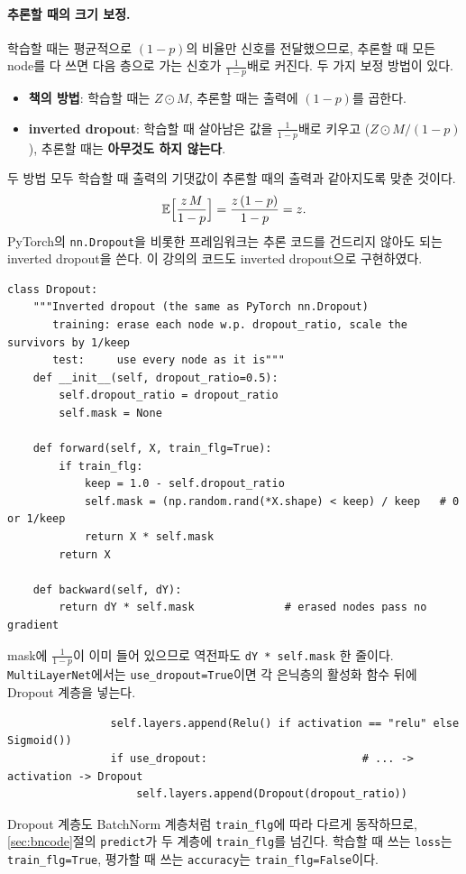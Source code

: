 \documentclass[11pt,a4paper]{article}
\begin{document}
\paragraph{추론할 때의 크기 보정.}
학습할 때는 평균적으로 $(1-p)$의 비율만 신호를 전달했으므로, 추론할 때 모든 node를 다 쓰면
다음 층으로 가는 신호가 $\frac{1}{1-p}$배로 커진다. 두 가지 보정 방법이 있다.
\begin{itemize}[leftmargin=1.8em]
\item \textbf{책의 방법}: 학습할 때는 $Z\odot M$, 추론할 때는 출력에 $(1-p)$를 곱한다.
\item \textbf{inverted dropout}: 학습할 때 살아남은 값을 $\frac{1}{1-p}$배로 키우고 ($Z\odot M/(1-p)$),
추론할 때는 \textbf{아무것도 하지 않는다}.
\end{itemize}
두 방법 모두 학습할 때 출력의 기댓값이 추론할 때의 출력과 같아지도록 맞춘 것이다.
\[
\mathbb E\Bigl[\frac{z\,M}{1-p}\Bigr]=\frac{z\,(1-p)}{1-p}=z.
\]
PyTorch의 \texttt{nn.Dropout}을 비롯한 프레임워크는 추론 코드를 건드리지 않아도 되는 inverted dropout을 쓴다.
이 강의의 코드도 inverted dropout으로 구현하였다.
\begin{lstlisting}
class Dropout:
    """Inverted dropout (the same as PyTorch nn.Dropout)
       training: erase each node w.p. dropout_ratio, scale the survivors by 1/keep
       test:     use every node as it is"""
    def __init__(self, dropout_ratio=0.5):
        self.dropout_ratio = dropout_ratio
        self.mask = None

    def forward(self, X, train_flg=True):
        if train_flg:
            keep = 1.0 - self.dropout_ratio
            self.mask = (np.random.rand(*X.shape) < keep) / keep   # 0 or 1/keep
            return X * self.mask
        return X

    def backward(self, dY):
        return dY * self.mask              # erased nodes pass no gradient
\end{lstlisting}
mask에 $\frac{1}{1-p}$이 이미 들어 있으므로 역전파도 \texttt{dY * self.mask} 한 줄이다.
\texttt{MultiLayerNet}에서는 \texttt{use\_dropout=True}이면 각 은닉층의 활성화 함수 뒤에 Dropout 계층을 넣는다.
\begin{lstlisting}
                self.layers.append(Relu() if activation == "relu" else Sigmoid())
                if use_dropout:                        # ... -> activation -> Dropout
                    self.layers.append(Dropout(dropout_ratio))
\end{lstlisting}
Dropout 계층도 BatchNorm 계층처럼 \texttt{train\_flg}에 따라 다르게 동작하므로,
\ref{sec:bncode}절의 \texttt{predict}가 두 계층에 \texttt{train\_flg}를 넘긴다.
학습할 때 쓰는 \texttt{loss}는 \texttt{train\_flg=True}, 평가할 때 쓰는 \texttt{accuracy}는 \texttt{train\_flg=False}이다.
\end{document}
